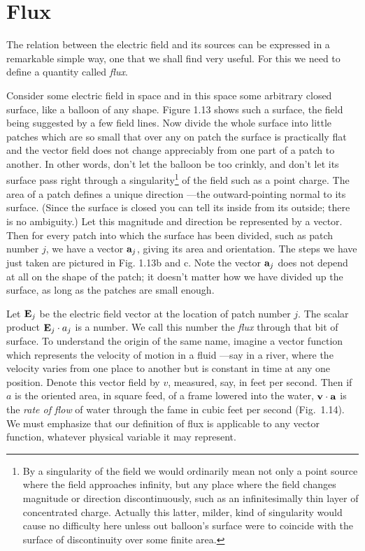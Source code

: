 \section{Flux}

The relation between the electric field and its sources can be
expressed in a remarkable simple way, one that we shall find very
useful. For this we need to define a quantity called \emph{flux}.

Consider some electric field in space and in this space some
arbitrary closed surface, like a balloon of any shape. Figure 1.13
shows such a surface, the field being suggested by a few field lines.
Now divide the whole surface into little patches which are so small
that over any on patch the surface is practically flat and the vector
field does not change appreciably from one part of a patch to
another. In other words, don't let the balloon be too crinkly, and
don't let its surface pass right through a singularity\footnote{By a
singularity of the field we would ordinarily mean not only a point
source where the field approaches infinity, but any place where the
field changes magnitude or direction discontinuously, such as an
infinitesimally thin layer of concentrated charge.
Actually this latter, milder, kind of singularity would cause no
difficulty here unless out balloon's surface were to coincide with
the surface of discontinuity over some finite area.} of the field
such as a point charge. The area of a patch defines a unique
direction ---the outward-pointing normal to its surface. (Since the
surface is closed you can tell its inside from its outside; there is
no ambiguity.) Let this magnitude and direction be represented by a
vector. Then for every patch into which the surface has been divided,
such as patch number $j$, we have a vector $\mathbf{a}_j$, giving its area
and orientation. The steps we have just taken are pictured in Fig.
1.13b and c. Note the vector $\mathbf{a}_j$ does not depend at all on
the shape of the patch; it doesn't matter how we have divided up the
surface, as long as the patches are small enough.

Let $\mathbf{E}_j$ be the electric field vector at the location of patch
number $j$. The scalar product $\mathbf{E}_j \cdot a_j$ is a number.
We call this number the \emph{flux} through that bit of surface.
To understand the origin of the same name, imagine a vector function
which represents the velocity of motion in a fluid ---say in a river,
where the velocity varies from one place to another but is constant
in time at any one position. Denote this vector field by $v$,
measured, say, in feet per second. Then if $a$ is the oriented area,
in square feed, of a frame lowered into the water, $\mathbf{v} \cdot \mathbf{a}$
is the \emph{rate of flow} of water through the fame in cubic feet
per second (Fig.~1.14). We must emphasize that our definition of
flux is applicable to any vector function, whatever physical variable
it may represent.

